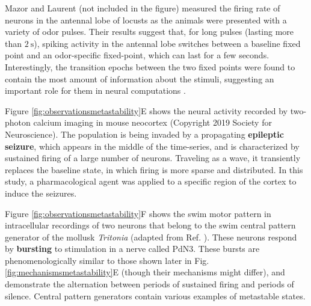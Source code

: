 \documentclass[reprint,superscriptaddress,showpacs,amsmath,amssymb,aps,floatfix,nolongbibliography]{revtex4-2}
\theoremstyle{definition}
\newcommand{\Emph}[1]{\textbf{#1}}
\begin{document}
Mazor and Laurent \cite{mazor2005transient} (not included in the figure) measured the firing rate of neurons in the antennal lobe of locusts as the animals were presented with a variety of odor pulses. Their results suggest that, for long pulses (lasting more than $\SI{2}{\second}$), spiking activity in the antennal lobe switches between a baseline fixed point and an odor-specific fixed-point, which can last for a few seconds. Interestingly, the transition epochs between the two fixed points were found to contain the most amount of information about the stimuli, suggesting an important role for them in neural computations \cite{mazor2005transient, rabinovich2008transientdynamics}.

Figure \ref{fig:observationsmetastability}E shows the neural activity recorded by two-photon calcium imaging in mouse neocortex \cite{wenzel2019acute} (Copyright 2019 Society for Neuroscience). The population is being invaded by a propagating \Emph{epileptic seizure}, which appears in the middle of the time-series, and is characterized by sustained firing of a large number of neurons. Traveling as a wave, it transiently replaces the baseline state, in which firing is more sparse and distributed. In this study, a pharmacological agent was applied to a specific region of the cortex to induce the seizures.



Figure \ref{fig:observationsmetastability}F shows the swim motor pattern in intracellular recordings of two neurons that belong to the swim central pattern generator of the mollusk \textit{Tritonia} \cite{sakurai2016recruitment} (adapted from Ref. \cite{sakurai2016recruitment}). These neurons respond by \Emph{bursting} to stimulation in a nerve called PdN3. These bursts are phenomenologically similar to those shown later in Fig. \ref{fig:mechanismsmetastability}E (though their mechanisms might differ), and demonstrate the alternation between periods of sustained firing and periods of silence. Central pattern generators \cite{marder2001central} contain various examples of metastable states. 
\end{document}
